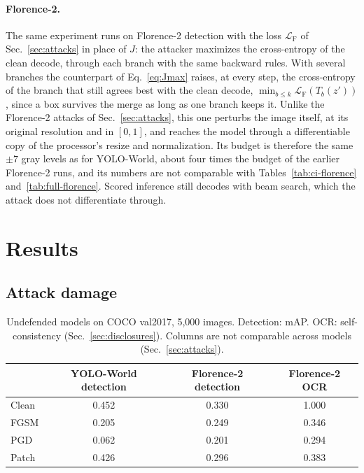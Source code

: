 \documentclass[11pt]{article}
\newcommand{\yw}{YOLO-World}
\newcommand{\fl}{Florence-2}
\begin{document}
\paragraph{\fl{}.} The same experiment runs on \fl{} detection with the
loss $\mathcal{L}_{\mathrm F}$ of Sec.~\ref{sec:attacks} in place of $J$:
the attacker maximizes the cross-entropy of the clean decode, through each
branch with the same backward rules. With several branches the counterpart
of Eq.~\ref{eq:Jmax} raises, at every step, the cross-entropy of the branch
that still agrees best with the clean decode,
$\min_{b\le k}\mathcal{L}_{\mathrm F}(T_b(z'))$, since a box survives the
merge as long as one branch keeps it. Unlike the \fl{} attacks of
Sec.~\ref{sec:attacks}, this one perturbs the image itself, at its original
resolution and in $[0,1]$, and reaches the model through a differentiable
copy of the processor's resize and normalization. Its budget is therefore
the same $\pm7$ gray levels as for \yw{}, about four times the budget of
the earlier \fl{} runs, and its numbers are not comparable with
Tables~\ref{tab:ci-florence} and~\ref{tab:full-florence}. Scored inference
still decodes with beam search, which the attack does not differentiate
through.

\section{Results}

\subsection{Attack damage}
\label{sec:damage}

\begin{table}[t]
\centering\small
\caption{Undefended models on COCO val2017, 5{,}000 images. Detection: mAP.
OCR: self-consistency (Sec.~\ref{sec:disclosures}). Columns are not
comparable across models (Sec.~\ref{sec:attacks}).}
\label{tab:damage}
\begin{tabular}{@{}lccc@{}}
\toprule
 & \yw{} detection & \fl{} detection & \fl{} OCR \\
\midrule
Clean & 0.452 & 0.330 & 1.000 \\
FGSM & 0.205 & 0.249 & 0.346 \\
PGD & 0.062 & 0.201 & 0.294 \\
Patch & 0.426 & 0.296 & 0.383 \\
\bottomrule
\end{tabular}
\end{table}
\end{document}
